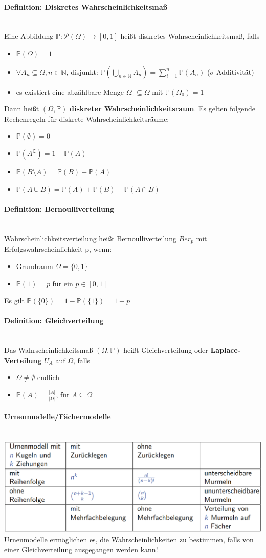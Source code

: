 \documentclass[parskip=full,12pt,a4paper,titlepage]{scrartcl}
\newcommand{\N}{\mathbb{N}}
\newcommand{\PP}{\mathbb{P}}
\newcommand{\pg}[1]{\paragraph{#1}\mbox{}\\}
\begin{document}
	\pg{Definition: Diskretes Wahrscheinlichkeitsmaß} 
	Eine Abbildung $\PP:\mathscr{P}(\Omega) \rightarrow [0,1]$ heißt diskretes Wahrscheinlichkeitsmaß, falls
	\begin{itemize}
		\item $\PP(\Omega)=1$
		\item $\forall A_n \subseteq \Omega, n\in\N$, disjunkt: $\PP(\bigcup\limits_{n\in \N} A_n)=\sum\limits_{i=1}^{n} \PP(A_n)$ \null\hfill($\sigma$-Additivität)
		\item es existiert eine abzählbare Menge $\Omega_0\subseteq\Omega$ mit $\PP(\Omega_0)=1$
	\end{itemize}
	Dann heißt $(\Omega, \PP)$ \textbf{diskreter Wahrscheinlichkeitsraum}.
	Es gelten folgende Rechenregeln für diskrete Wahrscheinlichkeitsräume:
	\begin{itemize}
		\item $\PP(\emptyset)=0$
		\item $\PP(A^{\mathsf{C}})=1-\PP(A)$
		\item $\PP(B\setminus A) = \PP(B)-\PP(A)$
		\item $\PP(A\cup B)=\PP(A)+\PP(B)-\PP(A\cap B)$
	\end{itemize}
	
	\pg{Definition: Bernoulliverteilung}
	Wahrscheinlichkeitsverteilung heißt Bernoulliverteilung $Ber_p$ mit Erfolgswahrscheinlichkeit p, wenn:
	\begin{itemize}
		\item Grundraum $\Omega={\{0,1\}}$
		\item $\PP(1)=p$ für ein $p\in[0,1]$
	\end{itemize}
	Es gilt $\PP(\{0\})=1-\PP(\{1\})=1-p$
	
	\pg{Definition: Gleichverteilung}
	Das Wahrscheinlichkeitsmaß $(\Omega,\PP)$ heißt Gleichverteilung oder \textbf{Laplace-Verteilung} $U_A$ auf $\Omega$, falls
	\begin{itemize}
		\item $\Omega\neq\emptyset$ endlich
		\item $\PP(A)=\frac{|A|}{|\Omega|}$, für $A\subseteq\Omega$
	\end{itemize}

	\pg{Urnenmodelle/Fächermodelle}
	\includegraphics[width=\textwidth]{images/image1.png}
	Urnenmodelle ermöglichen es, die Wahrscheinlichkeiten zu bestimmen, falls von einer Gleichverteilung ausgegangen
	werden kann!
	
\end{document}
